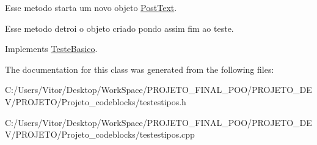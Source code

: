 Esse metodo starta um novo objeto \hyperlink{class_post_text}{Post\-Text}. 

Esse metodo detroi o objeto criado pondo assim fim ao teste. 

Implements \hyperlink{class_teste_basico_a9801730ac8a0acc39a901a179aa91e97}{Teste\-Basico}.



The documentation for this class was generated from the following files\-:\begin{DoxyCompactItemize}
\item 
C\-:/\-Users/\-Vitor/\-Desktop/\-Work\-Space/\-P\-R\-O\-J\-E\-T\-O\-\_\-\-F\-I\-N\-A\-L\-\_\-\-P\-O\-O/\-P\-R\-O\-J\-E\-T\-O\-\_\-\-D\-E\-V/\-P\-R\-O\-J\-E\-T\-O/\-Projeto\-\_\-codeblocks/testestipos.\-h\item 
C\-:/\-Users/\-Vitor/\-Desktop/\-Work\-Space/\-P\-R\-O\-J\-E\-T\-O\-\_\-\-F\-I\-N\-A\-L\-\_\-\-P\-O\-O/\-P\-R\-O\-J\-E\-T\-O\-\_\-\-D\-E\-V/\-P\-R\-O\-J\-E\-T\-O/\-Projeto\-\_\-codeblocks/testestipos.\-cpp\end{DoxyCompactItemize}
